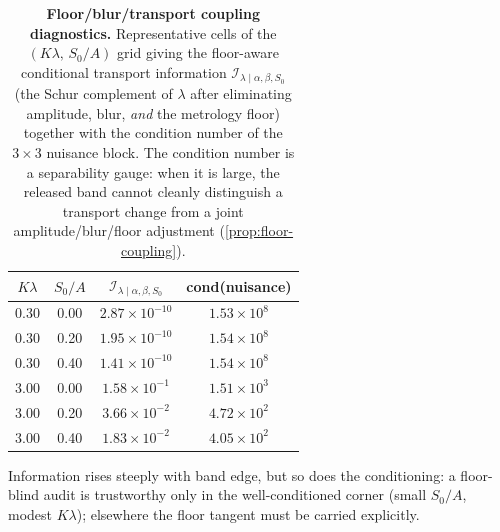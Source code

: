 \documentclass[11pt]{article}
\begin{document}
\begin{table}[htbp]
\centering
\small
\renewcommand{\arraystretch}{1.15}
\caption{\textbf{Floor/blur/transport coupling diagnostics.} Representative cells of the $(K\lambda,\,S_0/A)$ grid giving the floor-aware conditional transport information $\mathcal{I}_{\lambda\mid\alpha,\beta,S_0}$ (the Schur complement of $\lambda$ after eliminating amplitude, blur, \emph{and} the metrology floor) together with the condition number of the $3\times3$ nuisance block. The condition number is a separability gauge: when it is large, the released band cannot cleanly distinguish a transport change from a joint amplitude/blur/floor adjustment (\cref{prop:floor-coupling}).}
\label{tab:coupling-diagnostics}
\setlength{\tabcolsep}{8pt}
\begin{tabular}{c c c c}
\toprule
{$K\lambda$} & {$S_0/A$} & {$\mathcal{I}_{\lambda\mid\alpha,\beta,S_0}$} & {cond(nuisance)} \\
\midrule
0.30 & 0.00 & $2.87\times10^{-10}$ & $1.53\times10^{8}$ \\
0.30 & 0.20 & $1.95\times10^{-10}$ & $1.54\times10^{8}$ \\
0.30 & 0.40 & $1.41\times10^{-10}$ & $1.54\times10^{8}$ \\
3.00 & 0.00 & $1.58\times10^{-1}$ & $1.51\times10^{3}$ \\
3.00 & 0.20 & $3.66\times10^{-2}$ & $4.72\times10^{2}$ \\
3.00 & 0.40 & $1.83\times10^{-2}$ & $4.05\times10^{2}$ \\
\bottomrule
\end{tabular}
\par\vspace{3pt}
\begin{minipage}{0.92\linewidth}\footnotesize Information rises steeply with band edge, but so does the conditioning: a floor-blind audit is trustworthy only in the well-conditioned corner (small $S_0/A$, modest $K\lambda$); elsewhere the floor tangent must be carried explicitly.\end{minipage}
\end{table}
\end{document}
